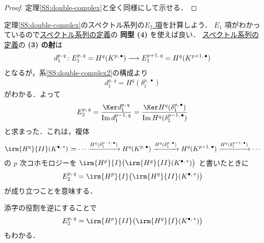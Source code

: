 \documentclass[algtopo_main]{subfiles}
\begin{document}
\begin{proof}
    定理\ref{SS:double-complex}と全く同様にして示せる．
\end{proof}

定理\ref{SS:double-complex}のスペクトル系列の\hyperref[def:SSQ]{$E_2$ 項}を計算しよう．
$E_1$ 項がわかっているので\hyperref[def:SSQ]{スペクトル系列の定義}の \textbf{同型 (4)} を使えば良い．
\hyperref[def:SSQ]{スペクトル系列の定義}の \textbf{(3) の射}は
\begin{align}
    d_1^{p,\, q} \colon E_1^{p,\, q} = H^q (K^{p,\, \bullet}) \longrightarrow E_1^{p+1,\, q} = H^q(K^{p+1,\, \bullet})
\end{align}
となるが，系\ref{SS:double-complex2}の構成より
\begin{align}
    d_1^{p,\, q} = H^q(\delta_1^{p,\, \bullet})
\end{align}
がわかる．よって
\begin{align}
    E_2^{p,\, q} = \frac{\Ker d_1^{p,\, q}}{\Im d_1^{p-1,\, q}} = \frac{\Ker H^q(\delta_1^{p,\, \bullet})}{\Im H^q(\delta_1^{p-1,\, \bullet})}
\end{align}
と求まった．これは，複体
\begin{align}
    \irm{H^q}{II} (K^{\bullet,\, *}) \coloneqq \cdots \xrightarrow{H^q(\delta_1^{p-1,\, \bullet})} H^q(K^{p,\, \bullet}) \xrightarrow{H^q(\delta_1^{p,\, \bullet})} H^q(K^{p+1,\, \bullet}) \xrightarrow{H^q(\delta_1^{p+1,\, \bullet})} \cdots
\end{align}
の $p$ 次コホモロジーを $\irm{H^p}{I}\bigl(\irm{H^q}{II} (K^{\bullet,\, *})\bigr)$ と書いたときに
\begin{align}
    \label{eq:SS-double-complex-E2-1}
    E_2^{p,\, q} = \irm{H^p}{I}\bigl(\irm{H^q}{II} (K^{\bullet,\, *})\bigr)
\end{align}
が成り立つことを意味する．

添字の役割を逆にすることで
\begin{align}
    \label{eq:SS-double-complex-E2-2}
    E_2^{p,\, q} = \irm{H^p}{II}\bigl(\irm{H^q}{I} (K^{\bullet,\, *})\bigr)
\end{align}
もわかる．
\end{document}
